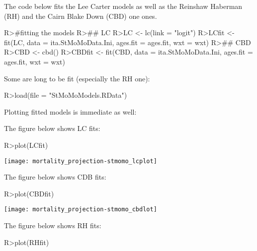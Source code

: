 \documentclass[nojss]{jss}
\begin{document}
The code below fits the Lee Carter models as well as the Reinshaw Haberman (RH) and the Cairn Blake Down (CBD) one \cite{Cairns2007;Renshaw2006} ones. 

\begin{Schunk}
\begin{Sinput}
R>#fitting the models
R>## LC
R>LC <- lc(link = "logit")
R>LCfit <- fit(LC, data = ita.StMoMoData.Ini, ages.fit = ages.fit, wxt = wxt)
R>## CBD
R>CBD <- cbd()
R>CBDfit <- fit(CBD, data = ita.StMoMoData.Ini, ages.fit = ages.fit, wxt = wxt)
\end{Sinput}
\end{Schunk}

Some are long to be fit (especially the RH one):

\begin{Schunk}
\end{Schunk}


\begin{Schunk}
\begin{Sinput}
R>load(file = "StMoMoModels.RData")
\end{Sinput}
\end{Schunk}


Plotting fitted models is immediate as well:

The figure below shows LC fits:

\begin{Schunk}
\begin{Sinput}
R>plot(LCfit)
\end{Sinput}
\end{Schunk}
\texttt{[image: mortality\_projection-stmomo\_lcplot]}

The figure below shows CDB fits:


\begin{Schunk}
\begin{Sinput}
R>plot(CBDfit)
\end{Sinput}
\end{Schunk}
\texttt{[image: mortality\_projection-stmomo\_cbdlot]}

The figure below shows RH fits:

\begin{Schunk}
\begin{Sinput}
R>plot(RHfit)
\end{Sinput}
\end{Schunk}
\end{document}
